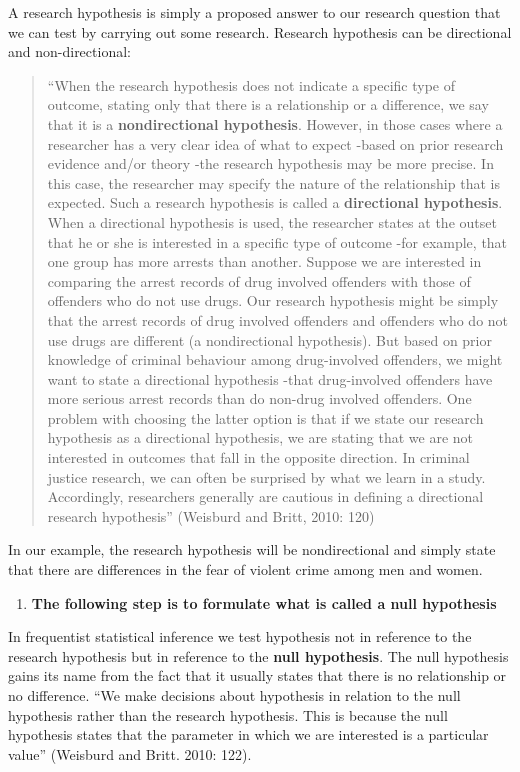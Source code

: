 \documentclass[]{book}
\providecommand{\tightlist}{%
  \setlength{\itemsep}{0pt}\setlength{\parskip}{0pt}}
\theoremstyle{definition}
\theoremstyle{definition}
\theoremstyle{definition}
\theoremstyle{remark}
\begin{document}
A research hypothesis is simply a proposed answer to our research
question that we can test by carrying out some research. Research
hypothesis can be directional and non-directional:

\begin{quote}
``When the research hypothesis does not indicate a specific type of
outcome, stating only that there is a relationship or a difference, we
say that it is a \textbf{nondirectional hypothesis}. However, in those
cases where a researcher has a very clear idea of what to expect -based
on prior research evidence and/or theory -the research hypothesis may be
more precise. In this case, the researcher may specify the nature of the
relationship that is expected. Such a research hypothesis is called a
\textbf{directional hypothesis}. When a directional hypothesis is used,
the researcher states at the outset that he or she is interested in a
specific type of outcome -for example, that one group has more arrests
than another. Suppose we are interested in comparing the arrest records
of drug involved offenders with those of offenders who do not use drugs.
Our research hypothesis might be simply that the arrest records of drug
involved offenders and offenders who do not use drugs are different (a
nondirectional hypothesis). But based on prior knowledge of criminal
behaviour among drug-involved offenders, we might want to state a
directional hypothesis -that drug-involved offenders have more serious
arrest records than do non-drug involved offenders. One problem with
choosing the latter option is that if we state our research hypothesis
as a directional hypothesis, we are stating that we are not interested
in outcomes that fall in the opposite direction. In criminal justice
research, we can often be surprised by what we learn in a study.
Accordingly, researchers generally are cautious in defining a
directional research hypothesis'' (Weisburd and Britt, 2010: 120)
\end{quote}

In our example, the research hypothesis will be nondirectional and
simply state that there are differences in the fear of violent crime
among men and women.

\begin{enumerate}
\def\labelenumi{\arabic{enumi}.}
\setcounter{enumi}{2}
\tightlist
\item
  \textbf{The following step is to formulate what is called a null
  hypothesis}
\end{enumerate}

In frequentist statistical inference we test hypothesis not in reference
to the research hypothesis but in reference to the \textbf{null
hypothesis}. The null hypothesis gains its name from the fact that it
usually states that there is no relationship or no difference. ``We make
decisions about hypothesis in relation to the null hypothesis rather
than the research hypothesis. This is because the null hypothesis states
that the parameter in which we are interested is a particular value''
(Weisburd and Britt. 2010: 122).
\end{document}
